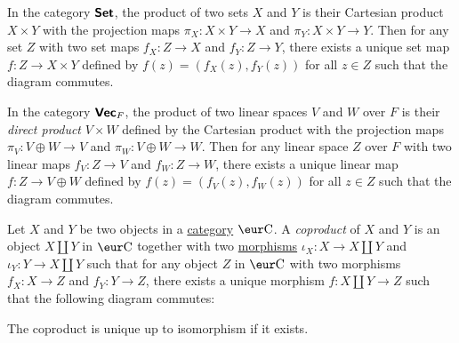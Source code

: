\begin{example}
  In the category $\operatorname{\text{\normalfont\bf\sffamily Set}}$, the product of two sets $X$ and $Y$ is their Cartesian product $X \times Y$ with the projection maps $\pi_X \colon X \times Y \to X$ and $\pi_Y \colon X \times Y \to Y$. Then for any set $Z$ with two set maps $f_X \colon Z \to X$ and $f_Y \colon Z \to Y$, there exists a unique set map $f \colon Z \to X \times Y$ defined by $f(z) = (f_X(z), f_Y(z))$ for all $z \in Z$ such that the diagram commutes.
\end{example}

\begin{example}
  In the category $\operatorname{\text{\normalfont\bf\sffamily Vec}}_F$, the product of two linear spaces $V$ and $W$ over $F$ is their \emph{direct product} $V \times W$ defined by the Cartesian product with the projection maps $\pi_V \colon V \oplus W \to V$ and $\pi_W \colon V \oplus W \to W$. Then for any linear space $Z$ over $F$ with two linear maps $f_V \colon Z \to V$ and $f_W \colon Z \to W$, there exists a unique linear map $f \colon Z \to V \oplus W$ defined by $f(z) = (f_V(z), f_W(z))$ for all $z \in Z$ such that the diagram commutes.
\end{example}

\begin{definition}[Coproduct]\label{def:coproduct}
  Let $X$ and $Y$ be two objects in a \hyperref[def:category]{category} $\Ca$. A \emph{coproduct} of $X$ and $Y$ is an object $X \coprod Y$ in $\Ca$ together with two \hyperref[def:morphism]{morphisms} $\iota_X \colon X \to X \coprod Y$ and $\iota_Y \colon Y \to X \coprod Y$ such that for any object $Z$ in $\Ca$ with two morphisms $f_X \colon X \to Z$ and $f_Y \colon Y \to Z$, there exists a unique morphism $f \colon X \coprod Y \to Z$ such that the following diagram commutes:
  \begin{center}
  \end{center}
\end{definition}

\begin{remark}
  The coproduct is unique up to isomorphism if it exists.
\end{remark}

